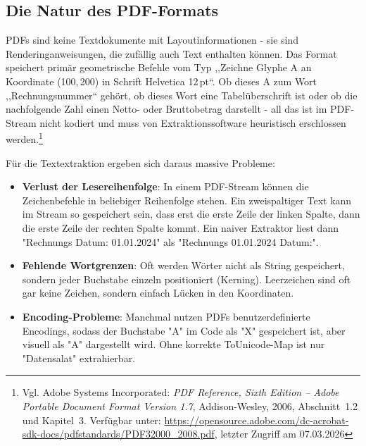 \subsection{Die Natur des PDF-Formats}
PDFs sind keine Textdokumente mit Layoutinformationen - sie sind Renderinganweisungen, die zufällig auch Text enthalten können. Das Format speichert primär geometrische Befehle vom Typ ,,Zeichne Glyphe A an Koordinate (100,\,200) in Schrift Helvetica 12\,pt``. Ob dieses A zum Wort ,,Rechnungsnummer`` gehört, ob dieses Wort eine Tabelüberschrift ist oder ob die nachfolgende Zahl einen Netto- oder Bruttobetrag darstellt - all das ist im PDF-Stream nicht kodiert und muss von Extraktionssoftware heuristisch erschlossen werden.\footnote{Vgl. Adobe Systems Incorporated: \textit{PDF Reference, Sixth Edition -- Adobe Portable Document Format Version 1.7}, Addison-Wesley, 2006, Abschnitt~1.2 und Kapitel~3. Verfügbar unter: \url{https://opensource.adobe.com/dc-acrobat-sdk-docs/pdfstandards/PDF32000_2008.pdf}, letzter Zugriff am 07.03.2026}

Für die Textextraktion ergeben sich daraus massive Probleme:
\begin{itemize}
    \item \textbf{Verlust der Lesereihenfolge}: In einem PDF-Stream können die Zeichenbefehle in beliebiger Reihenfolge stehen. Ein zweispaltiger Text kann im Stream so gespeichert sein, dass erst die erste Zeile der linken Spalte, dann die erste Zeile der rechten Spalte kommt. Ein naiver Extraktor liest dann "Rechnungs Datum: 01.01.2024" als "Rechnungs 01.01.2024 Datum:".
    \item \textbf{Fehlende Wortgrenzen}: Oft werden Wörter nicht als String gespeichert, sondern jeder Buchstabe einzeln positioniert (Kerning). Leerzeichen sind oft gar keine Zeichen, sondern einfach Lücken in den Koordinaten.
    \item \textbf{Encoding-Probleme}: Manchmal nutzen PDFs benutzerdefinierte Encodings, sodass der Buchstabe "A" im Code als "X" gespeichert ist, aber visuell als "A" dargestellt wird. Ohne korrekte ToUnicode-Map ist nur "Datensalat" extrahierbar.
\end{itemize}

